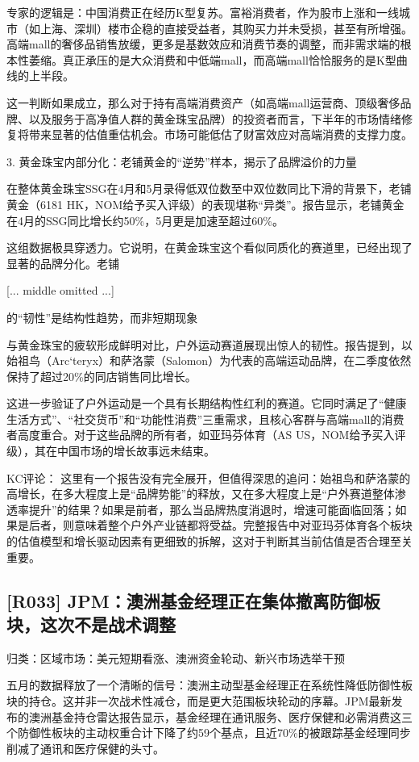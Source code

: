 \documentclass[11pt]{ctexart}
\begin{document}
专家的逻辑是：中国消费正在经历K型复苏。富裕消费者，作为股市上涨和一线城市（如上海、深圳）楼市企稳的直接受益者，其购买力并未受损，甚至有所增强。高端mall的奢侈品销售放缓，更多是基数效应和消费节奏的调整，而非需求端的根本性萎缩。真正承压的是大众消费和中低端mall，而高端mall恰恰服务的是K型曲线的上半段。

这一判断如果成立，那么对于持有高端消费资产（如高端mall运营商、顶级奢侈品牌、以及服务于高净值人群的黄金珠宝品牌）的投资者而言，下半年的市场情绪修复将带来显著的估值重估机会。市场可能低估了财富效应对高端消费的支撑力度。

3. 黄金珠宝内部分化：老铺黄金的“逆势”样本，揭示了品牌溢价的力量

在整体黄金珠宝SSG在4月和5月录得低双位数至中双位数同比下滑的背景下，老铺黄金（6181 HK，NOM给予买入评级）的表现堪称“异类”。报告显示，老铺黄金在4月的SSG同比增长约50\%，5月更是加速至超过60\%。

这组数据极具穿透力。它说明，在黄金珠宝这个看似同质化的赛道里，已经出现了显著的品牌分化。老铺

[... middle omitted ...]

的“韧性”是结构性趋势，而非短期现象

与黄金珠宝的疲软形成鲜明对比，户外运动赛道展现出惊人的韧性。报告提到，以始祖鸟（Arc‘teryx）和萨洛蒙（Salomon）为代表的高端运动品牌，在二季度依然保持了超过20\%的同店销售同比增长。

这进一步验证了户外运动是一个具有长期结构性红利的赛道。它同时满足了“健康生活方式”、“社交货币”和“功能性消费”三重需求，且核心客群与高端mall的消费者高度重合。对于这些品牌的所有者，如亚玛芬体育（AS US，NOM给予买入评级），其在中国市场的增长故事远未结束。

KC评论： 这里有一个报告没有完全展开，但值得深思的追问：始祖鸟和萨洛蒙的高增长，在多大程度上是“品牌势能”的释放，又在多大程度上是“户外赛道整体渗透率提升”的结果？如果是前者，那么当品牌热度消退时，增速可能面临回落；如果是后者，则意味着整个户外产业链都将受益。完整报告中对亚玛芬体育各个板块的估值模型和增长驱动因素有更细致的拆解，这对于判断其当前估值是否合理至关重要。

\subsection{[R033] JPM：澳洲基金经理正在集体撤离防御板块，这次不是战术调整}
{\small\color{refgray}归类：区域市场：美元短期看涨、澳洲资金轮动、新兴市场选举干预}

五月的数据释放了一个清晰的信号：澳洲主动型基金经理正在系统性降低防御性板块的持仓。这并非一次战术性减仓，而是更大范围板块轮动的序幕。JPM最新发布的澳洲基金持仓雷达报告显示，基金经理在通讯服务、医疗保健和必需消费这三个防御性板块的主动权重合计下降了约59个基点，且近70\%的被跟踪基金经理同步削减了通讯和医疗保健的头寸。
\end{document}
